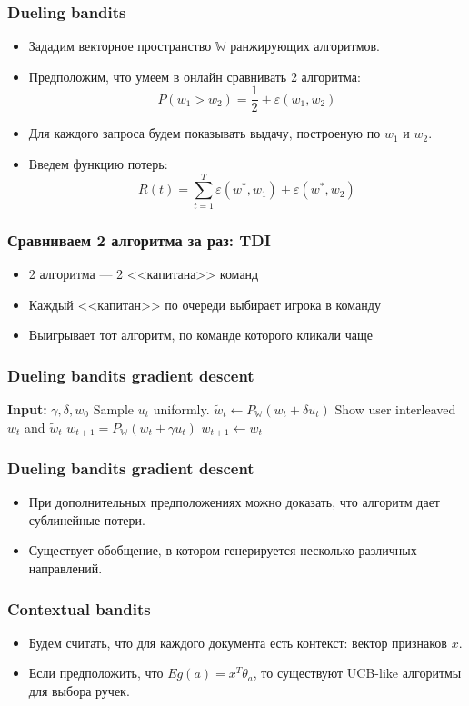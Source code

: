 \documentclass[xetex,mathserif,serif,table]{beamer}
\begin{document}
\begin{frame}
\frametitle{Dueling bandits}

\begin{itemize}
  \item Зададим векторное пространство $\mathbb{W}$ ранжирующих алгоритмов.
  \item Предположим, что умеем в онлайн сравнивать 2 алгоритма:
  $$P(w_1 > w_2) = \frac{1}{2} + \varepsilon(w_1, w_2)$$
  \item Для каждого запроса будем показывать выдачу, построеную по $w_1$ и $w_2$.
  \item Введем функцию потерь:
  $$ R(t) = \sum\limits_{t=1}^{T} \varepsilon(w^{*}, w_1) + \varepsilon(w^{*}, w_2)$$
\end{itemize}
\end{frame}

\begin{frame}
\frametitle{Сравниваем 2 алгоритма за раз: TDI}
\begin{itemize}
  \item 2 алгоритма — 2 <<капитана>> команд
  \item Каждый <<капитан>> по очереди выбирает игрока в команду
  \item Выигрывает тот алгоритм, по команде которого кликали чаще
\end{itemize} 
\end{frame}


\begin{frame}
\frametitle{Dueling bandits gradient descent}

\begin{algorithmic}
\State \textbf{Input: } $\gamma, \delta, w_0$
  \State Sample $u_t$ uniformly.
  \State $\tilde{w}_t \gets P_{\mathbb{W}} (w_t + \delta u_t)$ 
  \State Show user interleaved $w_t$ and $\tilde{w}_t$ 
    \State $w_{t+1} = P_{\mathbb{W}} (w_t + \gamma u_t)$
  \Else
    \State $w_{t+1} \gets w_{t}$
  \EndIf
\EndFor 
\end{algorithmic}
\end{frame}

\begin{frame}
\frametitle{Dueling bandits gradient descent}
\begin{itemize}
\item При дополнительных предположениях можно доказать, что алгоритм дает сублинейные потери. 
\item Существует обобщение, в котором генерируется несколько различных направлений.
\end{itemize}
\end{frame}

\begin{frame}
\frametitle{Contextual bandits}
\begin{itemize} 
\item Будем считать, что для каждого документа есть контекст: вектор признаков  $x$.
\item Если предположить, что $Eg(a) = x^{T} \theta_{a}$, то существуют UCB-like алгоритмы для выбора ручек.

\end{itemize}
\end{frame}





\end{document}
